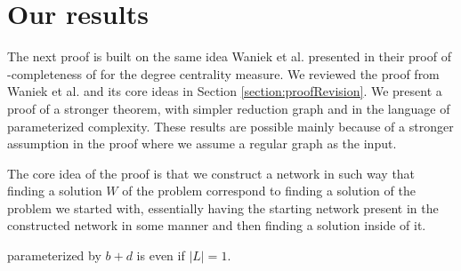 \section{Our results}\label{section:OurResults}

The next proof is built on the same idea Waniek et al. \cite{Waniek2017} presented in their proof of
\NP-completeness of \HLshort for the degree centrality measure.
We reviewed the proof from Waniek et al. \cite{Waniek2017} and its core ideas in Section \ref{section:proofRevision}.
We present a proof of a stronger theorem, with simpler reduction graph and in the language of parameterized complexity.
These results are possible mainly because of a stronger assumption in the proof where we assume a regular graph as the input.

The core idea of the proof is that we construct a network in such way that finding a solution $W$ of the \HL problem
correspond to finding a solution of the problem we started with, essentially having the starting network
present in the constructed network in some manner and then finding a solution inside of it.

\begin{theorem}\label{theorem:DB}
    \HL parameterized by $b + d$ is \Wh even if $|L| = 1$.
\end{theorem}

